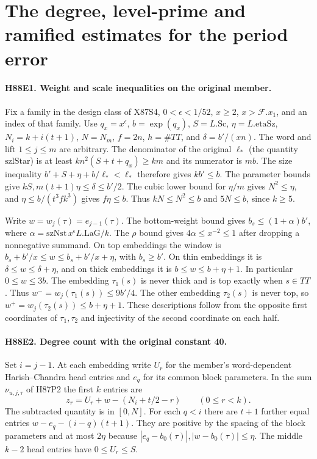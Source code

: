 \section{The degree, level-prime and ramified estimates for the period error}

\paragraph{H88E1. Weight and scale inequalities on the original member.}
Fix a family in the design class of X87S4, $0<\epsilon<1/52$,
$x\ge2$, $x>\mathcal F.x_1$, and an index of that family. Use
$q_x=x^\epsilon$, $b=\exp(q_x)$, $S=L.\mathrm{Sc}$,
$\eta=L.\mathrm{etaSz}$, $N_i=k+i(t+1)$, $N=N_m$,
$f=2n$, $h=\#TT$, and $\delta=b'/(xn)$. The word and lift
$1\le j\le m$ are arbitrary.
The denominator of the original $\ell_*$
(the quantity $\mathrm{szlStar}$) is at least
$kn^2(S+t+q_x)\ge km$ and its numerator is $mb$.
The size inequality $b'+S+\eta+b/\ell_*<\ell_*$
therefore gives $kb'\le b$. The parameter bounds give
$kS,m(t+1)\eta\le\delta\le b'/2$.
The cubic lower bound for $\eta/m$ gives $N^2\le\eta$, and
$\eta\le b/(t^3fk^3)$ gives $f\eta\le b$.
Thus $kN\le N^2\le b$ and $5N\le b$, since $k\ge5$.

Write $w=w_j(\tau)=e_{j-1}(\tau)$. The bottom-weight bound gives
$b_s\le(1+\alpha)b'$, where $\alpha=\mathrm{szNst}\,x^\epsilon
L.\mathrm{LaG}/k$. The $\rho$ bound gives $4\alpha\le x^{-2}\le1$
after dropping a nonnegative summand. On top embeddings the window is
$b_s+b'/x\le w\le b_s+b'/x+\eta$, with $b_s\ge b'$.
On thin embeddings it is $\delta\le w\le\delta+\eta$, and on
thick embeddings it is $b\le w\le b+\eta+1$. In particular
$0\le w\le3b$.
The embedding $\tau_1(s)$ is never thick and is top exactly when
$s\in TT$. Thus $w^-=w_j(\tau_1(s))\le9b'/4$.
The other embedding $\tau_2(s)$ is never top, so
$w^+=w_j(\tau_2(s))\le b+\eta+1$. These descriptions follow
from the opposite first coordinates of $\tau_1,\tau_2$ and
injectivity of the second coordinate on each half.

\paragraph{H88E2. Degree count with the original constant 40.}
Set $i=j-1$. At each embedding write $U_r$ for the member's
word-dependent Harish--Chandra head entries and $e_q$ for its
common block parameters. In the sum $\nu_{u,j,\tau}$ of H87P2
the first $k$ entries are
\[
 z_r=U_r+w-(N_i+t/2-r)\qquad(0\le r<k).
\]
The subtracted quantity is in $[0,N]$. For each $q<i$ there are
$t+1$ further equal entries $w-e_q-(i-q)(t+1)$.
They are positive by the spacing of the block parameters and
at most $2\eta$ because $|e_q-b_0(\tau)|,|w-b_0(\tau)|\le\eta$.
The middle $k-2$ head entries have $0\le U_r\le S$.

